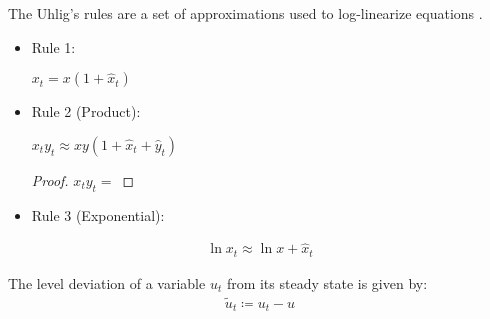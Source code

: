 \documentclass[../thesis.tex]{subfiles}
\begin{document}

\begin{lemma}\label{lemma:uhligs-rules}
	
	The Uhlig's rules are a set of approximations used to log-linearize equations \cite[Lecture 6, p.2]{solis-garcia_ucb_2022}.
	
	\begin{itemize}
		\item Rule 1: \label{uhlig-rule-1}
		
		\( x_t = x(1 + \hat{x}_t) \) 
		
		\item Rule 2 (Product):
		
		\( x_t y_t \approx xy(1 + \hat{x}_t + \hat{y}_t) \) 
		
		\begin{proof}
			\( 
			x_t y_t	= 
			\)

		\end{proof}
		
		
		\item Rule 3 (Exponential):
		
		
	\end{itemize}
	
\end{lemma}

\begin{corollary}\label{coro:logarithm-rule}
	
	\begin{align*}
		\ln x_t \approx \ln x + \hat{x}_t
	\end{align*}
	
\end{corollary}


\begin{definition}\label{def:level-deviation}
	
	The level deviation of a variable $u_t$ from its steady state is given by: \cite[Lecture 9, p.9]{solis-garcia_ucb_2022}
	\begin{align}
		\widetilde{u}_t \coloneq u_t - u \label{eq:level-deviation}
	\end{align}
	
\end{definition}
\end{document}

